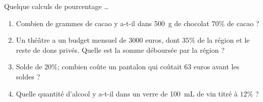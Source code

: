 
\begin{exercice}\label{exo2smath-0211}

    Quelque calculs de pourcentage \ldots
    \begin{enumerate}
        \item
            Combien de grammes de cacao y a-t-il dans \SI{500}{\gram} de chocolat \( 70\%\) de cacao ?
        \item
            Un théâtre a un budget mensuel de \( 3000\) euros, dont \( 35\%\) de la région et le reste de dons privés. Quelle est la somme déboursée par la région ?
        \item
            Solde de \( 20\%\); combien coûte un pantalon qui coûtait \( 63\) euros avant les soldes ?
        \item
            Quelle quantité d'alcool y a-t-il dans un verre de \SI{100}{\milli\liter} de vin titré à \( 12\%\) ?
    \end{enumerate}

\end{exercice}
